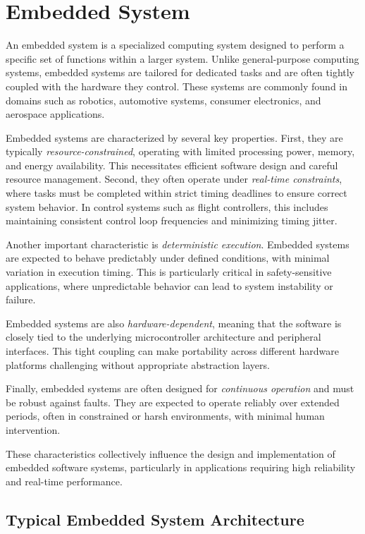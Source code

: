 \section{Embedded System}
\label{sec:embedded}

An embedded system is a specialized computing system designed to perform a specific set of functions within a larger system. Unlike general-purpose computing systems, embedded systems are tailored for dedicated tasks and are often tightly coupled with the hardware they control. These systems are commonly found in domains such as robotics, automotive systems, consumer electronics, and aerospace applications.

Embedded systems are characterized by several key properties. First, they are typically \textit{resource-constrained}, operating with limited processing power, memory, and energy availability. This necessitates efficient software design and careful resource management. Second, they often operate under \textit{real-time constraints}, where tasks must be completed within strict timing deadlines to ensure correct system behavior. In control systems such as flight controllers, this includes maintaining consistent control loop frequencies and minimizing timing jitter.

Another important characteristic is \textit{deterministic execution}. Embedded systems are expected to behave predictably under defined conditions, with minimal variation in execution timing. This is particularly critical in safety-sensitive applications, where unpredictable behavior can lead to system instability or failure.

Embedded systems are also \textit{hardware-dependent}, meaning that the software is closely tied to the underlying microcontroller architecture and peripheral interfaces. This tight coupling can make portability across different hardware platforms challenging without appropriate abstraction layers.

Finally, embedded systems are often designed for \textit{continuous operation} and must be robust against faults. They are expected to operate reliably over extended periods, often in constrained or harsh environments, with minimal human intervention.

These characteristics collectively influence the design and implementation of embedded software systems, particularly in applications requiring high reliability and real-time performance.

\subsection{Typical Embedded System Architecture}

